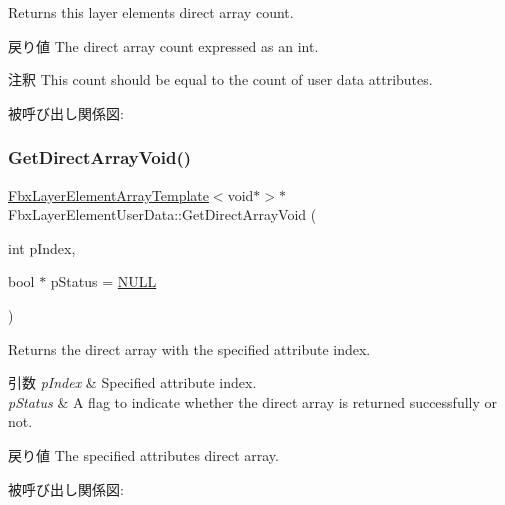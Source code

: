 Returns this layer element\textquotesingle{}s direct array count. \begin{DoxyReturn}{戻り値}
The direct array count expressed as an int. 
\end{DoxyReturn}
\begin{DoxyRemark}{注釈}
This count should be equal to the count of user data attributes. 
\end{DoxyRemark}
被呼び出し関係図\+:
\mbox{\label{class_fbx_layer_element_user_data_a8e1bfcb6d75d16a53275f69b1636d737}} 
\subsubsection{\texorpdfstring{Get\+Direct\+Array\+Void()}{GetDirectArrayVoid()}\hspace{0.1cm}{\footnotesize\ttfamily [1/4]}}
{\footnotesize\ttfamily \hyperlink{class_fbx_layer_element_array_template}{Fbx\+Layer\+Element\+Array\+Template}$<$void$\ast$$>$$\ast$ Fbx\+Layer\+Element\+User\+Data\+::\+Get\+Direct\+Array\+Void (\begin{DoxyParamCaption}\item[{int}]{p\+Index,  }\item[{bool $\ast$}]{p\+Status = {\ttfamily \hyperlink{fbxarch_8h_a070d2ce7b6bb7e5c05602aa8c308d0c4}{N\+U\+LL}} }\end{DoxyParamCaption})}

Returns the direct array with the specified attribute index. 
\begin{DoxyParams}{引数}
{\em p\+Index} & Specified attribute index. \\
\hline
{\em p\+Status} & A flag to indicate whether the direct array is returned successfully or not. \\
\hline
\end{DoxyParams}
\begin{DoxyReturn}{戻り値}
The specified attribute\textquotesingle{}s direct array. 
\end{DoxyReturn}
被呼び出し関係図\+:
\mbox{\label{class_fbx_layer_element_user_data_a271bf5d91c8de1a35ffaef1404dd31db}} 
